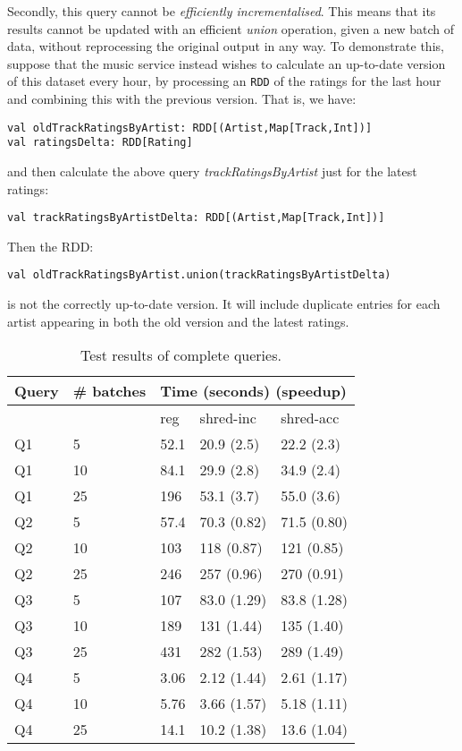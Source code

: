 {Secondly, this query cannot be \textit{efficiently incrementalised}. This means that its results cannot be updated with an efficient \textit{union} operation, given a new batch of data, without reprocessing the original output in any way. To demonstrate this, suppose that the music service instead wishes to calculate an up-to-date version of this dataset every hour, by processing an \lstinline{RDD} of the ratings for the last hour and combining this with the previous version. That is, we have:
\vs\begin{lstlisting}
val oldTrackRatingsByArtist: RDD[(Artist,Map[Track,Int])]
val ratingsDelta: RDD[Rating]
\end{lstlisting}\vs
and then calculate the above query \textit{trackRatingsByArtist} just for the latest ratings:
\vs\begin{lstlisting}
val trackRatingsByArtistDelta: RDD[(Artist,Map[Track,Int])]
\end{lstlisting}\vs
Then the RDD:
\vs\begin{lstlisting}
val oldTrackRatingsByArtist.union(trackRatingsByArtistDelta)
\end{lstlisting}\vs
is not the correctly up-to-date version. It will include duplicate entries for each artist appearing in both the old version and the latest ratings. 
}

\begin{table}[]
\begin{tabular}{|l|l|l|l|l|}
\hline
Query & \# batches & \multicolumn{3}{l|}{Time (seconds) (speedup)} \\ \hline
      &            & reg       & shred-inc       & shred-acc       \\ \hline
Q1    & 5          & 52.1      & 20.9 (2.5)      & 22.2 (2.3)      \\ \hline
Q1    & 10         & 84.1      & 29.9 (2.8)      & 34.9 (2.4)      \\ \hline
Q1    & 25         & 196       & 53.1 (3.7)      & 55.0 (3.6)      \\ \hline
Q2    & 5          & 57.4      & 70.3 (0.82)     & 71.5 (0.80)     \\ \hline
Q2    & 10         & 103       & 118 (0.87)      & 121 (0.85)      \\ \hline
Q2    & 25         & 246       & 257 (0.96)      & 270 (0.91)      \\ \hline
Q3    & 5          & 107       & 83.0 (1.29)     & 83.8 (1.28)     \\ \hline
Q3    & 10         & 189       & 131 (1.44)      & 135 (1.40)      \\ \hline
Q3    & 25         & 431       & 282 (1.53)      & 289 (1.49)      \\ \hline
Q4    & 5          & 3.06      & 2.12 (1.44)     & 2.61 (1.17)     \\ \hline
Q4    & 10         & 5.76      & 3.66 (1.57)     & 5.18 (1.11)     \\ \hline
Q4    & 25         & 14.1      & 10.2 (1.38)     & 13.6 (1.04)     \\ \hline
\end{tabular}
\caption{Test results of complete queries.}
\label{mainresults}
\end{table}
